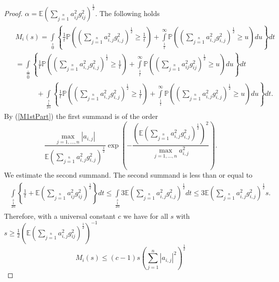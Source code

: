 \documentclass[12pt,a4paper]{article}
\newcommand{\Pv}{\mathbb{P}}
\newcommand{\Ex}{\mathbb{E}}
\begin{document}
\begin{proof}
$\alpha=\Ex\left(\sum\limits_{j=1}\limits^{n}a_{ij}^2g_{ij}^2\right)^{\frac{1}{2}}$.
The following holds
\begin{eqnarray*}
	\left.\begin{split}
	& M_i(s)=\int\limits_{0}\limits^s\left\{\frac{1}{t}\Pv\left(\left(\sum\limits_{j=1}\limits^{n}a_{i,j}^2g_{i,j}^2\right)^{\frac{1}{2}}\geq\frac{1}{t}\right)+\int\limits_{\frac{1}{t}}^{\infty}\Pv\left(\left(\sum\limits_{j=1}\limits^na_{i,j}^2g_{i,j}^2\right)^{\frac{1}{2}}\geq u\right)du\right\}dt\\
	& =\int\limits_{0}\limits^{\frac{1}{2\alpha}}\left\{\frac{1}{t}\Pv\left(\left(\sum\limits_{j=1}\limits^{n}a_{i,j}^2g_{i,j}^2\right)^{\frac{1}{2}}\geq\frac{1}{t}\right)+\int\limits_{\frac{1}{t}}^{\infty}\Pv\left(\left(\sum\limits_{j=1}\limits^na_{ij}^2g_{ij}^2\right)^{\frac{1}{2}}\geq u\right)du\right\}dt\\
	&\quad\quad\quad+\int\limits_{\frac{1}{2\alpha}}\limits^s\left\{\frac{1}{t}\Pv\left(\left(\sum\limits_{j=1}\limits^{n}a_{i,j}^2g_{i,j}^2\right)^{\frac{1}{2}}\geq\frac{1}{t}\right)+\int\limits_{\frac{1}{t}}^{\infty}\Pv\left(\left(\sum\limits_{j=1}\limits^na_{i,j}^2g_{i,j}^2\right)^{\frac{1}{2}}\geq u\right)du\right\}dt.
	\end{split}\right.
\end{eqnarray*}
By (\ref{M1stPart}) the first summand is of the order
$$
\frac{\max\limits_{j=1,\dots,n}|a_{i,j}|}
{\Ex\left(\sum\limits_{j=1}\limits^{n}a_{i,j}^2g_{i,j}^2\right)^{\frac{1}{2}}}\exp\left(-\frac{\left(\Ex\left(\sum\limits_{j=1}\limits^{n}a_{i,j}^2g_{i,j}^2\right)^{\frac{1}{2}}\right)^2}{\max\limits_{j=1,\dots,n}a_{i,j}^2}\right).
	$$
	We estimate the second summand. The second summand is less than or equal to
	\begin{eqnarray*}
	\left.\begin{split}
\int\limits_{\frac{1}{2\alpha}}\limits^s\left\{\frac{1}{t}+\Ex\left(\sum\limits_{j=1}\limits^na_{ij}^2g_{ij}^2\right)^{\frac{1}{2}}\right\}dt 
\leq \int\limits_{\frac{1}{2\alpha}}\limits^s3\Ex\left(\sum\limits_{j=1}\limits^na_{i,j}^2g_{i,j}^2\right)^{\frac{1}{2}}dt
	\leq3\Ex\left(\sum\limits_{j=1}\limits^na_{i,j}^2g_{i,j}^2\right)^{\frac{1}{2}}s.	\end{split}\right.
\end{eqnarray*}
Therefore, with a universal constant $c$ we have for all $s$ with
$s\geq\frac{1}{2}\left(\Ex\left(\sum\limits_{j=1}\limits^{n}a_{i,j}^2g_{ij}^2\right)^{\frac{1}{2}}\right)^{-1}$
$$
M_{i}(s)\leq (c-1) s \left(\sum_{j=1}^{n}|a_{i,j}|^{2}\right)^{\frac{1}{2}}
$$
\end{proof}
\end{document}
